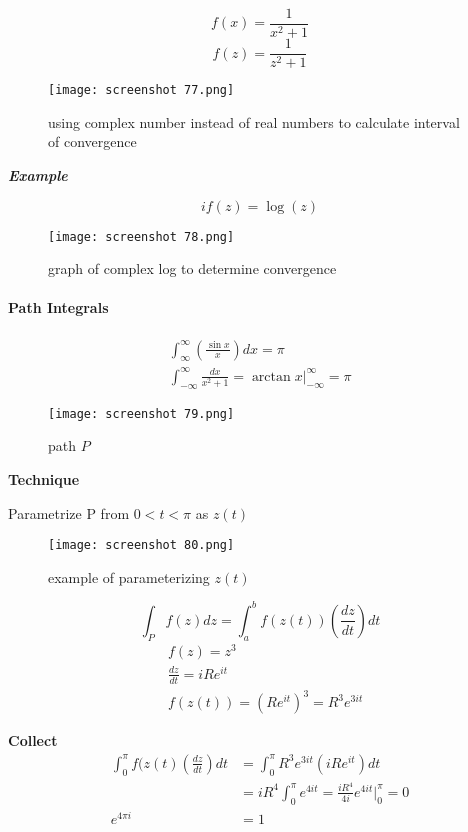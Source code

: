 \documentclass[svgnames]{article}   	%
\begin{document}
\[
f(x) = \frac{1}{x^2 + 1}
\]
\[
f(z) = \frac{1}{z^2 + 1}
\]

\begin{figure}[H]
  \centering
    \texttt{[image: screenshot 77.png]}
    \caption{using complex number instead of real numbers to calculate interval
    of convergence}
\end{figure}



\textbf{ \textit{Example}}

\[i
f(z) = \log(z) 
\]
\begin{figure}[H]
  \centering
    \texttt{[image: screenshot 78.png]}
    \caption{graph of complex log to determine convergence}
\end{figure}




\paragraph{Path Integrals}

\begin{align*}
  \int_{\infty}^{\infty} \left(\frac{\sin x}{x} \right) dx = \pi \\
  \int_{-\infty}^{\infty} \frac{dx}{x^2 + 1} = \arctan
  x \big|_{-\infty}^{\infty} = \pi
\end{align*}

\begin{figure}[H]
  \centering
    \texttt{[image: screenshot 79.png]}
    \caption{path $P$}
\end{figure}


\textbf{Technique}

Parametrize P from $ 0 < t < \pi$ as  $z(t)$

\begin{figure}[H]
  \centering
    \texttt{[image: screenshot 80.png]}
    \caption{example of parameterizing $z(t)$}
\end{figure}


\[
\int_P f(z)dz = \int_a^b f(z(t)) \left( \frac{d z}{d t} \right)dt 
\]
\begin{align*}
  &f(z) = z^3 \\
  &\frac{d z}{d t} = iRe^{it} \\
  &f(z(t)) = \left(Re^{it} \right)^3 = R^3e^{3it}
\end{align*}

\textbf{Collect}  
\begin{align*}
  \int_0^\pi f(z(t) \left( \frac{d z}{d t}  \right) dt &= \int_0^\pi R^3e^{3it}
  (iRe^{it})dt \\
                                                       &= i R^4 \int_0^\pi e^{4 i t} = \frac{iR^4}{4i} e^{4it} \Big|_0^\pi = 0 \\
  e^{4\pi i} &= 1
\end{align*}
\end{document}
